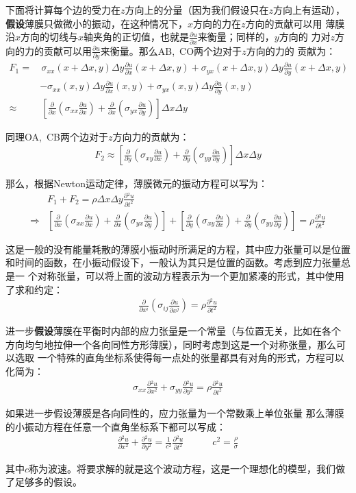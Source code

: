\documentclass[a4paper]{ctexart}
\newcommand{\pdv}[2]{\frac{\partial{#1}}{\partial{#2}}}
\begin{document}
	下面将计算每个边的受力在$z$方向上的分量（因为我们假设只在$z$方向上有运动），
	\textbf{假设}薄膜只做微小的振动，在这种情况下，$x$方向的力在$z$方向的贡献可以用
	薄膜沿$x$方向的切线与$x$轴夹角的正切值，也就是$\pdv{u}{x}$来衡量；同样的，$y$方向的
	力对$z$方向的力的贡献可以用$\pdv{u}{y}$来衡量。那么AB,\, CO两个边对于$z$方向的力的
	贡献为：
	\begin{align}
		F_{1} =& \,\sigma_{xx}(x+\Delta x, y)\Delta y\pdv{u}{x}(x+\Delta x, y) + \sigma_{yx}(x+\Delta x, y)\Delta y\pdv{u}{y}(x+\Delta x, y)\\
		&- \sigma_{xx}(x, y)\Delta y\pdv{u}{x}(x, y) + \sigma_{yx}(x, y)\Delta y\pdv{u}{y}(x, y)\\
		\approx& \, \left[\pdv{}{x}\left(\sigma_{xx}\pdv{u}{x}\right) + \pdv{}{x}\left(\sigma_{yx}\pdv{u}{y}\right)\right]\Delta x\Delta y
	\end{align}
	\par 同理OA,\, CB两个边对于$z$方向力的贡献为：
	\begin{align}
		F_{2} \approx  \left[\pdv{}{y}\left(\sigma_{xy}\pdv{u}{x}\right) + \pdv{}{y}\left(\sigma_{yy}\pdv{u}{y}\right)\right]\Delta x\Delta y
	\end{align}
	\par 那么，根据Newton运动定律，薄膜微元的振动方程可以写为：
	\begin{align}
		&F_{1} + F_{2} = \rho \Delta x\Delta y \pdv{^{2}u}{t^{2}}\\
		\Rightarrow& \left[\pdv{}{x}\left(\sigma_{xx}\pdv{u}{x}\right) + \pdv{}{x}\left(\sigma_{yx}\pdv{u}{y}\right)\right] + 
		\left[\pdv{}{y}\left(\sigma_{xy}\pdv{u}{x}\right) + \pdv{}{y}\left(\sigma_{yy}\pdv{u}{y}\right)\right] = \rho\pdv{^2 u}{t^{2}}
	\end{align}
	\par 这是一般的没有能量耗散的薄膜小振动时所满足的方程，其中应力张量可以是位置
	和时间的函数，在小振动假设下，一般认为其只是位置的函数。考虑到应力张量总是一
	个对称张量\cite{b}，可以将上面的波动方程表示为一个更加紧凑的形式，其中使用了求和约定：
	\begin{align}
		\pdv{}{x^{i}}\left(\sigma_{ij}\pdv{u}{x^{j}}\right) = \rho\pdv{^2 u}{t^2}
	\end{align}
	
	进一步\textbf{假设}薄膜在平衡时内部的应力张量是一个常量（与位置无关，比如在各个
	方向均匀地拉伸一个各向同性方形薄膜），同时考虑到这是一个对称张量，那么可以选取
	一个特殊的直角坐标系使得每一点处的张量都具有对角的形式，方程可以化简为：
	\begin{align}
		\sigma_{xx}\pdv{^{2}u}{x^{2}} + \sigma_{yy}\pdv{^2 u}{y^2} = \rho \pdv{^{2}u}{t^{2}}
	\end{align}
	\par 如果进一步假设薄膜是各向同性的，应力张量为一个常数乘上单位张量
	那么薄膜的小振动方程在任意一个直角坐标系下都可以写成：
	\begin{align}
		\pdv{^2 u}{x^2} + \pdv{^{2}u}{y^{2}} = \frac{1}{c^{2}}\pdv{^2 u}{t^2}\quad\quad\quad c^2 = \frac{\rho}{\sigma}
	\end{align}
	\par 其中$c$称为波速。将要求解的就是这个波动方程，这是一个理想化的模型，我们做了足够多的假设。
\end{document}
